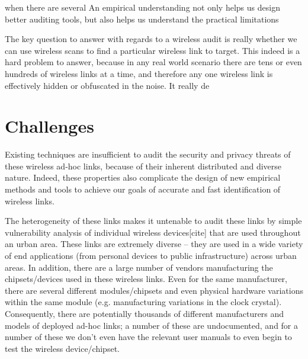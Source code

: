 when there are several An empirical understanding not only helps us design better auditing tools, but also helps us understand the practical limitations

The key question to answer with regards to a wireless audit is really whether we can use wireless scans to find a particular wireless link to target. This indeed is a hard problem to answer, because in any real world scenario there are tens or even hundreds of wireless links at a time, and therefore any one wireless link is effectively hidden or obfuscated in the noise. It really de

\section{Challenges}
Existing techniques are insufficient to audit the security and privacy threats of these wireless ad-hoc links, because of their inherent distributed and diverse nature. Indeed, these properties also complicate the design of new empirical methods and tools to achieve our goals of accurate and fast identification of wireless links.

The heterogeneity of these links makes it untenable to audit these links by simple vulnerability analysis of individual wireless devices[cite] that are used throughout an urban area. These links are extremely diverse – they are used in a wide variety of end applications (from personal devices to public infrastructure) across urban areas. In addition, there are a large number of vendors manufacturing the chipsets/devices used in these wireless links. Even for the same manufacturer, there are several different modules/chipsets  and even physical hardware variations within the same module (e.g. manufacturing variations in the clock crystal). Consequently, there are potentially thousands of different manufacturers and models of deployed ad-hoc links; a number of these are undocumented, and for a number of these we don’t even have the relevant user manuals to even begin to test the wireless device/chipset.

